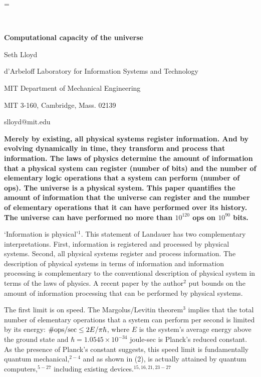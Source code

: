 \magnification=
\hfuzz=6pt
\baselineskip=16pt

$ $

\vskip 1in

\centerline{\bf Computational capacity of the universe}

\bigskip

\centerline{Seth Lloyd}

\centerline{d'Arbeloff Laboratory for Information Systems and Technology}

\centerline{MIT Department of Mechanical Engineering}

\centerline{MIT 3-160, Cambridge, Mass. 02139}

\centerline{slloyd@mit.edu}

\bigskip

{\bf 
Merely by existing, all physical systems register information.
And by evolving dynamically in time, they transform and process
that information.  The laws of physics determine the amount of 
information that a physical system can register (number of
bits) and the number of elementary logic operations that 
a system can perform (number of ops).  The universe is a physical
system.  This paper quantifies the amount of information that the
universe can register and the number of elementary operations that
it can have performed over its history.   The universe can have 
performed no more than $10^{120}$ ops on $10^{90}$ bits.
}

`Information is physical'$^1$.  This statement of Landauer has two
complementary interpretations.  First, information is registered and
processed by physical systems.  Second, all physical systems register
and process information.  The description of physical systems in terms
of information and information processing is complementary to the conventional
description of physical system in terms of the laws of physics.
A recent paper by the author$^2$ put bounds 
on the amount of information processing that can be performed by
physical systems.  
	
The first limit is on speed.  The Margolus/Levitin theorem$^3$
implies that the total number of elementary operations that a 
system can perform per second is limited by its energy:
${\rm \# ops/sec} \leq 2 E/\pi\hbar$, where $E$ is the system's
average energy above the ground state and $\hbar = 1.0545 \times 10^{-34}$ 
joule-sec is Planck's reduced constant.  As the presence of Planck's constant
suggests, this speed limit is fundamentally quantum mechanical,$^{2-4}$ and 
as shown in (2), is actually attained by quantum computers,$^{5-27}$     
including existing devices.$^{15,16, 21, 23-27}$  


